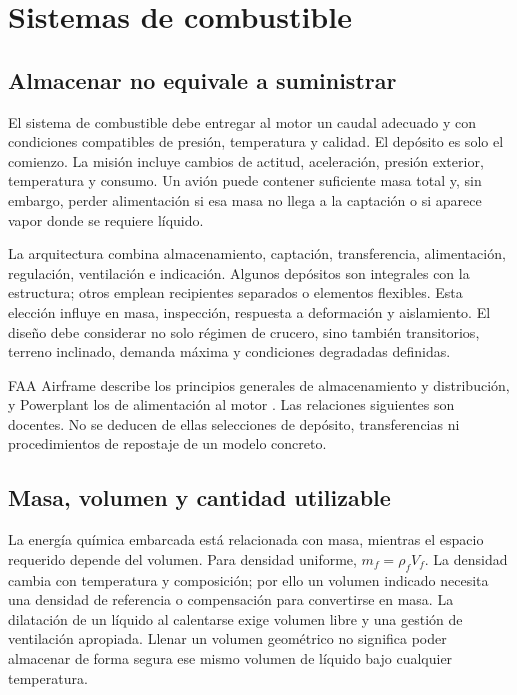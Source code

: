 \chapter{Sistemas de combustible}\label{ch:23}

\section{Almacenar no equivale a suministrar}
El sistema de combustible debe entregar al motor un caudal adecuado y con condiciones compatibles de presión, temperatura y calidad. El depósito es solo el comienzo. La misión incluye cambios de actitud, aceleración, presión exterior, temperatura y consumo. Un avión puede contener suficiente masa total y, sin embargo, perder alimentación si esa masa no llega a la captación o si aparece vapor donde se requiere líquido.

La arquitectura combina almacenamiento, captación, transferencia, alimentación, regulación, ventilación e indicación. Algunos depósitos son integrales con la estructura; otros emplean recipientes separados o elementos flexibles. Esta elección influye en masa, inspección, respuesta a deformación y aislamiento. El diseño debe considerar no solo régimen de crucero, sino también transitorios, terreno inclinado, demanda máxima y condiciones degradadas definidas.

FAA Airframe describe los principios generales de almacenamiento y distribución, y Powerplant los de alimentación al motor \cite{FAA-AIRFRAME,FAA-POWERPLANT}. Las relaciones siguientes son docentes. No se deducen de ellas selecciones de depósito, transferencias ni procedimientos de repostaje de un modelo concreto.


\section{Masa, volumen y cantidad utilizable}
La energía química embarcada está relacionada con masa, mientras el espacio requerido depende del volumen. Para densidad uniforme, $m_f=\rho_fV_f$. La densidad cambia con temperatura y composición; por ello un volumen indicado necesita una densidad de referencia o compensación para convertirse en masa. La dilatación de un líquido al calentarse exige volumen libre y una gestión de ventilación apropiada. Llenar un volumen geométrico no significa poder almacenar de forma segura ese mismo volumen de líquido bajo cualquier temperatura.


